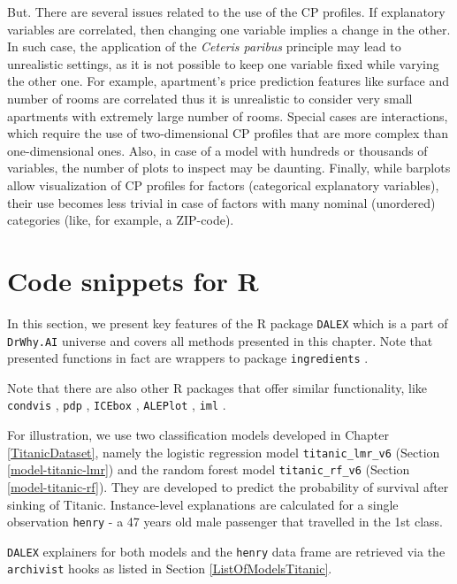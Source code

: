 \documentclass[]{krantz}
\begin{document}
But. There are several issues related to the use of the CP profiles. If explanatory variables are correlated, then changing one variable implies a change in the other. In such case, the application of the \emph{Ceteris paribus} principle may lead to unrealistic settings, as it is not possible to keep one variable fixed while varying the other one. For example, apartment's price prediction features like surface and number of rooms are correlated thus it is unrealistic to consider very small apartments with extremely large number of rooms. Special cases are interactions, which require the use of two-dimensional CP profiles that are more complex than one-dimensional ones. Also, in case of a model with hundreds or thousands of variables, the number of plots to inspect may be daunting. Finally, while barplots allow visualization of CP profiles for factors (categorical explanatory variables), their use becomes less trivial in case of factors with many nominal (unordered) categories (like, for example, a ZIP-code).

\hypertarget{CPR}{%
\section{Code snippets for R}\label{CPR}}

In this section, we present key features of the R package \texttt{DALEX} which is a part of \texttt{DrWhy.AI} universe and covers all methods presented in this chapter. Note that presented functions in fact are wrappers to package \texttt{ingredients} \citep{ingredientsRPackage}.

Note that there are also other R packages that offer similar functionality, like \texttt{condvis} \citep{condvisRPackage}, \texttt{pdp} \citep{pdpRPackage}, \texttt{ICEbox} \citep{ICEbox}, \texttt{ALEPlot} \citep{ALEPlotRPackage}, \texttt{iml} \citep{imlRPackage}.

For illustration, we use two classification models developed in Chapter \ref{TitanicDataset}, namely the logistic regression model \texttt{titanic\_lmr\_v6} (Section \ref{model-titanic-lmr}) and the random forest model \texttt{titanic\_rf\_v6} (Section \ref{model-titanic-rf}). They are developed to predict the probability of survival after sinking of Titanic. Instance-level explanations are calculated for a single observation \texttt{henry} - a 47 years old male passenger that travelled in the 1st class.

\texttt{DALEX} explainers for both models and the \texttt{henry} data frame are retrieved via the \texttt{archivist} hooks as listed in Section \ref{ListOfModelsTitanic}.
\end{document}
